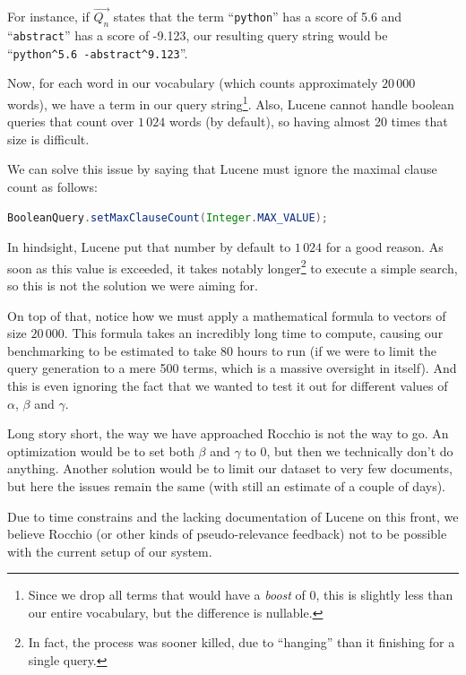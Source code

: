 \documentclass[11pt]{article}
\begin{document}
For instance, if $\overrightarrow{Q_n}$ states that the term ``\texttt{python}'' has a score of 5.6 and ``\texttt{abstract}'' has a score of -9.123, our resulting query string would be ``\texttt{python\string^5.6 -abstract\string^9.123}''.

Now, for each word in our vocabulary (which counts approximately $20\,000$ words), we have a term in our query string\footnote{Since we drop all terms that would have a \textit{boost} of 0, this is slightly less than our entire vocabulary, but the difference is nullable.}. Also, Lucene cannot handle boolean queries that count over $1\,024$ words (by default), so having almost 20 times that size is difficult.

We can solve this issue by saying that Lucene must ignore the maximal clause count as follows:
\begin{lstlisting}[language=Java]
BooleanQuery.setMaxClauseCount(Integer.MAX_VALUE);
\end{lstlisting}

In hindsight, Lucene put that number by default to $1\,024$ for a good reason. As soon as this value is exceeded, it takes notably longer\footnote{In fact, the process was sooner killed, due to ``hanging'' than it finishing for a single query.} to execute a simple search, so this is not the solution we were aiming for.

On top of that, notice how we must apply a mathematical formula to vectors of size $20\,000$. This formula takes an incredibly long time to compute, causing our benchmarking to be estimated to take 80 hours to run (if we were to limit the query generation to a mere 500 terms, which is a massive oversight in itself). And this is even ignoring the fact that we wanted to test it out for different values of $\alpha$, $\beta$ and $\gamma$.

Long story short, the way we have approached Rocchio is not the way to go. An optimization would be to set both $\beta$ and $\gamma$ to 0, but then we technically don't do anything. Another solution would be to limit our dataset to very few documents, but here the issues remain the same (with still an estimate of a couple of days).

Due to time constrains and the lacking documentation of Lucene on this front, we believe Rocchio (or other kinds of pseudo-relevance feedback) not to be possible with the current setup of our system.

\clearpage


\end{document}
